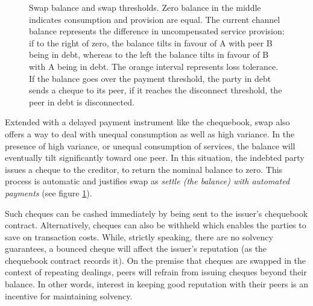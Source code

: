 \documentclass[a4paper,10pt]{article}
\begin{document}
\begin{center}
\begin{figure}
\begin{center}
\end{center}
\caption{Swap balance and swap thresholds.
Zero balance in the middle indicates consumption and provision are equal.
The current channel balance represents the difference in uncompensated service provision:
if to the right of zero, the balance tilts in favour of A with peer B being in debt, whereas to the left
the balance tilts in favour of B with A being in debt.
The orange interval represents loss tolerance. If the balance goes over the payment threshold, the party in
debt sends a cheque to its peer, if it reaches the disconnect threshold, the peer in debt is disconnected.}
\label{fig:swap}
\end{figure}
\end{center}


Extended with a delayed payment instrument like the chequebook, swap also offers a way to deal with unequal consumption
as well as high variance.
In the presence of high variance, or unequal consumption of services, the balance will eventually tilt significantly toward one peer. In this situation, the indebted
party issues a cheque to the creditor, to return the nominal balance to zero. This process is automatic and justifies swap as \emph{settle (the balance) with automated payments}
(see figure \ref{fig:swap}).

Such cheques can be cashed immediately by being sent to the issuer's chequebook contract. Alternatively, cheques can also be withheld
which enables the parties to save on transaction costs.
While, strictly speaking, there are no solvency guarantees, a bounced cheque will affect the issuer's reputation (as the chequebook contract records it).
On the premise that cheques are swapped in the context of repeating dealings, peers will refrain from
issuing cheques beyond their balance. In other words, interest in keeping good reputation with their peers is an incentive for maintaining solvency.
\end{document}
